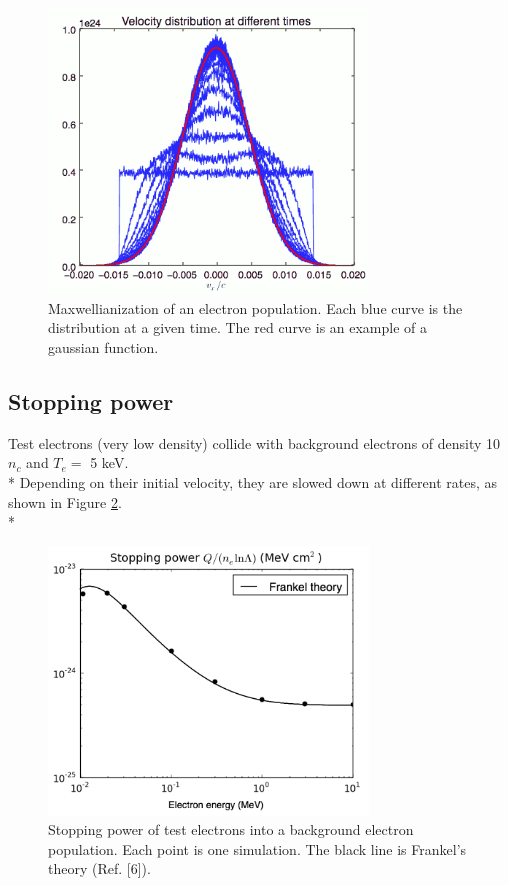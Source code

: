 \documentclass[11pt]{article}
\begin{document}
\begin{figure}[h]
\centering
\includegraphics[width=8.5cm]{Maxwellianization1}
\caption{Maxwellianization of an electron population. Each blue curve is the distribution at a given time. The red curve is an example of a gaussian function.}
\label{maxwellianization}
\end{figure}


\subsection{Stopping power}
Test electrons (very low density) collide with background electrons of density 10 $n_c$ and $T_e=$ 5 keV.\\*
Depending on their initial velocity, they are slowed down at different rates, as shown in Figure \ref{stoppingpower}.\\*

\begin{figure}[h]
\centering
\includegraphics[width=8.5cm]{Stopping_power123}
\parbox{14cm}{\caption{Stopping power of test electrons into a background electron population. Each point is one simulation.
The black line is Frankel's theory (Ref. [6]).}}
\label{stoppingpower}
\end{figure}
\end{document}
